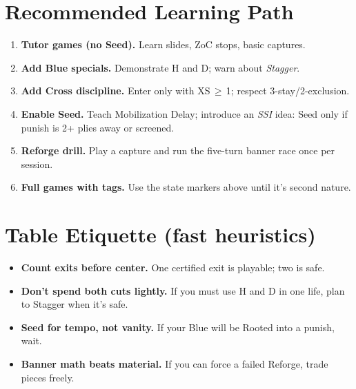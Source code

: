 \documentclass[11pt]{article}
\begin{document}
\section*{Recommended Learning Path}
\begin{enumerate}[label=\arabic*)]
  \item \textbf{Tutor games (no Seed).} Learn slides, ZoC stops, basic captures.
  \item \textbf{Add Blue specials.} Demonstrate H and D; warn about \emph{Stagger}.
  \item \textbf{Add Cross discipline.} Enter only with XS\,$\ge$\,1; respect 3-stay/2-exclusion.
  \item \textbf{Enable Seed.} Teach Mobilization Delay; introduce an \emph{SSI} idea: Seed only if punish is 2+ plies away or screened.
  \item \textbf{Reforge drill.} Play a capture and run the five-turn banner race once per session.
  \item \textbf{Full games with tags.} Use the state markers above until it’s second nature.
\end{enumerate}

\section*{Table Etiquette (fast heuristics)}
\begin{itemize}
  \item \textbf{Count exits before center.} One certified exit is playable; two is safe.
  \item \textbf{Don’t spend both cuts lightly.} If you must use H and D in one life, plan to Stagger when it’s safe.
  \item \textbf{Seed for tempo, not vanity.} If your Blue will be Rooted into a punish, wait.
  \item \textbf{Banner math beats material.} If you can force a failed Reforge, trade pieces freely.
\end{itemize}
\end{document}
